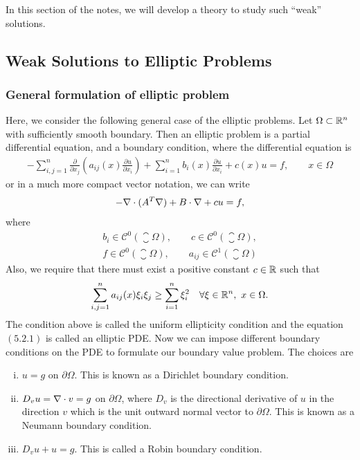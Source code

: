 \FloatBarrier
In this section of the notes, we will develop a theory to study such ``weak'' solutions.


\subsection{Weak Solutions to Elliptic Problems}

\subsubsection*{General formulation of elliptic problem}
Here, we consider the following general case of the elliptic problems. Let $ \Omega \subset \R^n $ with sufficiently smooth boundary. Then an elliptic problem is a partial differential equation, and a boundary condition, where the differential equation is
\begin{align*}
	 -\sum_{i,j=1}^{n}\frac{\partial}{\partial x_j}(a_{ij}(x) \frac{\partial u}{\partial x_i}) + \sum_{i=1}^{n}b_i(x) \frac{\partial u}{\partial x_i} + c(x) u = f, \qquad x \in \Omega \tag{5.2.1}
\end{align*}
or in a much more compact vector notation, we can write
\[  -\div{(A^T \grad{u})} + B \cdot \grad{u} + c u = f,  \]
where
\begin{align*}
	b_i \in \mathscr{C}^0(\closure{\Omega}), \qquad c \in \mathscr{C}^0(\closure{\Omega}),\\
	f \in \mathscr{C}^0(\closure{\Omega}), \qquad a_{ij} \in \mathscr{C}^1(\closure{\Omega}) \tag{5.2.1.C}
\end{align*}
Also, we require that there must exist a positive constant $ c \in \R $ such that
\[ \sum_{i,j=1}^{n} a_{ij}(x) \xi_i \xi_j \geq \sum_{i=1}^{n}\xi_i^2 \quad \forall \xi \in \R^n,\ x \in \Omega. \]
The condition above is called the uniform ellipticity condition and the equation $ (5.2.1) $ is called an elliptic PDE. Now we can impose different boundary conditions on the PDE to formulate our boundary value problem. The choices are
\begin{enumerate}[(i)]	
	\item $ u = g $ on $ \partial \Omega $. This is known as a Dirichlet boundary condition.
	\item $ D_v u = \grad{u}\cdot v = g $ on $ \partial \Omega $, where $ D_v $ is the directional derivative of $ u $ in the direction $ v $ which is the unit outward normal vector to $ \partial \Omega $. This is known as a Neumann boundary condition. 
	\item $ D_v u + u = g $. This is called a Robin boundary condition.
\end{enumerate}

